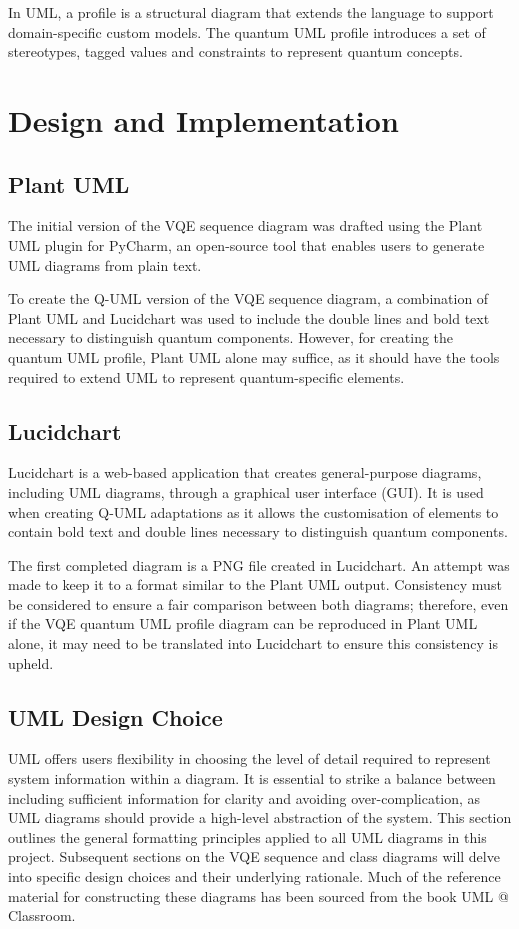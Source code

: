 \documentclass{article}
\begin{document}
{In UML, a profile is a structural diagram that extends the language to support domain-specific custom models. The quantum UML profile introduces a set of stereotypes, tagged values and constraints to represent quantum concepts. 

\section{Design and Implementation}
\subsection{Plant UML}

The initial version of the VQE sequence diagram was drafted using the Plant UML plugin for PyCharm, an open-source tool that enables users to generate UML diagrams from plain text.

To create the Q-UML version of the VQE sequence diagram, a combination of Plant UML and Lucidchart was used to include the double lines and bold text necessary to distinguish quantum components. However, for creating the quantum UML profile, Plant UML alone may suffice, as it should have the tools required to extend UML to represent quantum-specific elements. 

\subsection{Lucidchart}

Lucidchart is a web-based application that creates general-purpose diagrams, including UML diagrams, through a graphical user interface (GUI). It is used when creating Q-UML adaptations as it allows the customisation of elements to contain bold text and double lines necessary to distinguish quantum components. 

The first completed diagram is a PNG file created in Lucidchart. An attempt was made to keep it to a format similar to the Plant UML output. Consistency must be considered to ensure a fair comparison between both diagrams; therefore, even if the VQE quantum UML profile diagram can be reproduced in Plant UML alone, it may need to be translated into Lucidchart to ensure this consistency is upheld.

\subsection{UML Design Choice}

UML offers users flexibility in choosing the level of detail required to represent system information within a diagram. It is essential to strike a balance between including sufficient information for clarity and avoiding over-complication, as UML diagrams should provide a high-level abstraction of the system. This section outlines the general formatting principles applied to all UML diagrams in this project. Subsequent sections on the VQE sequence and class diagrams will delve into specific design choices and their underlying rationale. Much of the reference material for constructing these diagrams has been sourced from the book UML @ Classroom\cite{Seidl_Scholz_Huemer_Kappel_Duffy_2014}. 

}
\end{document}

